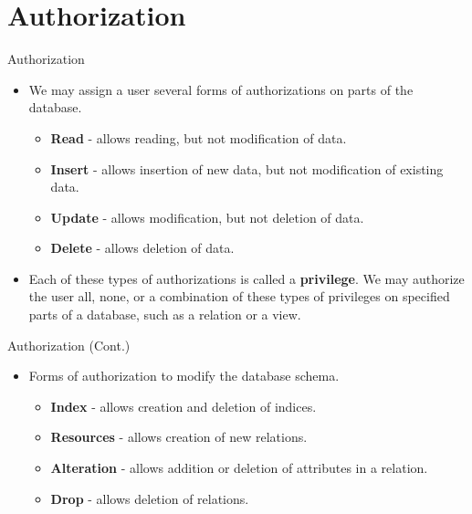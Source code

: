 \documentclass{beamer}
\begin{document}
\section{Authorization}

\begin{frame}{Authorization}
    \begin{itemize}
        \item We may assign a user several forms of authorizations on parts of the database.
        \begin{itemize}
            \item \textbf{Read} - allows reading, but not modification of data.
            \item \textbf{Insert} - allows insertion of new data, but not modification of existing data.
            \item \textbf{Update} - allows modification, but not deletion of data.
            \item \textbf{Delete} - allows deletion of data.
        \end{itemize}
        \item Each of these types of authorizations is called a \textbf{privilege}.  We may authorize the user all, none, or a combination of these types of privileges on specified parts of a database, such as a relation or a view.
    \end{itemize}
\end{frame}

\begin{frame}{Authorization (Cont.)}
    \begin{itemize}
        \item Forms of authorization to modify the database schema.
        \begin{itemize}
            \item \textbf{Index} - allows creation and deletion of indices.
            \item \textbf{Resources} - allows creation of new relations.
            \item \textbf{Alteration} - allows addition or deletion of attributes in a relation.
            \item \textbf{Drop} - allows deletion of relations.
        \end{itemize}
    \end{itemize}
\end{frame}
\end{document}
